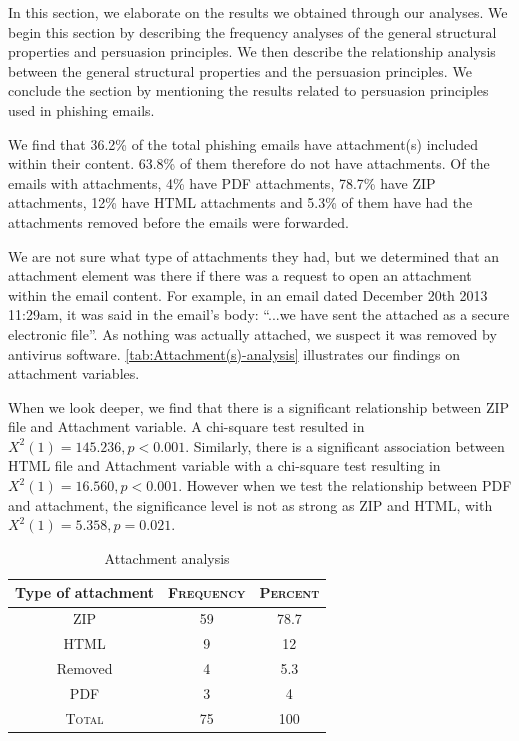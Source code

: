 In this section, we elaborate on the results we obtained through our
analyses. We begin this section by describing the frequency analyses
of the general structural properties and persuasion principles. We
then describe the relationship analysis between the general structural
properties and the persuasion principles. We conclude the section
by mentioning the results related to persuasion principles used in
phishing emails.

We find that 36.2\% of the total phishing emails have attachment(s)
included within their content. 63.8\% of them therefore do not have
attachments. Of the emails with attachments, 4\% have PDF attachments,
78.7\% have ZIP attachments, 12\% have HTML attachments and 5.3\%
of them have had the attachments removed before the emails were forwarded. 

We are not sure what type of attachments they had, but we determined
that an attachment element was there if there was a request to open
an attachment within the email content. For example, in an email dated
December 20th 2013 11:29am, it was said in the email's body: \textquotedblleft ...we
have sent the attached as a secure electronic file\textquotedblright .
As nothing was actually attached, we suspect it was removed by antivirus
software. \autoref{tab:Attachment(s)-analysis} illustrates our findings
on attachment variables. 

When we look deeper, we find that there is a significant relationship
between ZIP file and Attachment variable. A chi-square test resulted
in $X^{2}(1)=145.236,p<0.001$. Similarly, there is a significant
association between HTML file and Attachment variable with a chi-square
test resulting in $X^{2}(1)=16.560,p<0.001$. However when we test
the relationship between PDF and attachment, the significance level
is not as strong as ZIP and HTML, with $X^{2}(1)=5.358,p=0.021$.

\begin{table}[H]
\begin{centering}
\begin{tabular}{ccc}
\toprule 
Type of attachment & \textsc{Frequency} & \textsc{Percent}\tabularnewline
\midrule
\midrule 
{\footnotesize{}ZIP } & {\footnotesize{}59} & {\footnotesize{}78.7}\tabularnewline
\midrule 
{\footnotesize{}HTML } & {\footnotesize{}9} & {\footnotesize{}12}\tabularnewline
\midrule 
{\footnotesize{}Removed } & {\footnotesize{}4} & {\footnotesize{}5.3}\tabularnewline
\midrule 
{\footnotesize{}PDF} & {\footnotesize{}3} & {\footnotesize{}4}\tabularnewline
\midrule 
\textsc{\footnotesize{}Total} & {\footnotesize{}75} & {\footnotesize{}100}\tabularnewline
\bottomrule
\end{tabular}\protect\caption{\label{tab:Attachment(s)-analysis}Attachment analysis}

\par\end{centering}

%
%
\end{table}


